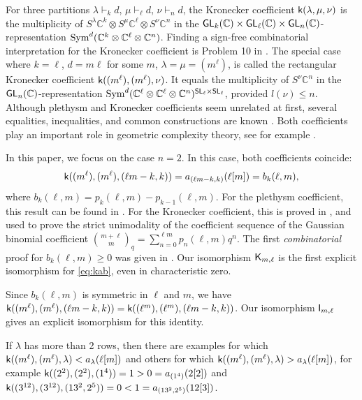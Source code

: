 \documentclass[a4paper]{extarticle}
\newcommand{\IC}{\mathbb{C}}
\newcommand{\GL}{\textsf{\textup{GL}}}
\newcommand{\SL}{\textsf{\textup{SL}}}
\newcommand{\Sym}{\textup{Sym}}
\newcommand{\la}{\lambda}
\newcommand{\KP}{\textsf{\textup{K}}}
\newcommand{\I}{\textsf{\textup{I}}}
\renewcommand{\k}{\textsf{\textup{k}}}
\numberwithin{theorem}{section}
\theoremstyle{definition}
\begin{document}
For three partitions $\la\vdash_k d$, $\mu\vdash_\ell d$, $\nu \vdash_n d$, the Kronecker coefficient $\k(\la,\mu,\nu)$ is the multiplicity of $S^\la \IC^k\otimes S^\mu \IC^\ell\otimes S^\nu \IC^n$ in the $\GL_k(\IC)\times\GL_\ell(\IC)\times\GL_n(\IC)$-representation $\Sym^d(\IC^k\otimes\IC^\ell\otimes\IC^n)$.
Finding a sign-free combinatorial interpretation for the Kronecker coefficient is Problem 10 in \cite{Sta:00}.
The special case where $k=\ell$, $d=m\ell$ for some $m$, $\la=\mu=(m^\ell)$, is called the rectangular Kronecker coefficient $\k((m^\ell),(m^\ell),\nu)$.
It equals the multiplicity of $S^\nu\IC^n$ in the $\GL_n(\IC)$-representation $\Sym^d(\IC^\ell\otimes\IC^\ell\otimes\IC^n)^{\SL_\ell\times\SL_\ell}$,
provided $l(\nu)\leq n$.
Although plethysm and Kronecker coefficients seem unrelated at first, several equalities, inequalities, and common constructions are known \cite{Man:11,Ike:12,IP:17,IMW:17,FI:20}.
Both coefficients play an important role in geometric complexity theory, see for example \cite{BLMW11,Bur16,Bur24}.

In this paper, we focus on the case $n=2$.
In this case, both coefficients coincide:
\begin{equation}\label{eq:kab}
\k((m^\ell),(m^\ell),(\ell m-k,k)) = a_{(\ell m -k,k)}(\ell[m]) = b_k(\ell,m),
\end{equation}
where $b_k(\ell,m) = p_k(\ell,m)-p_{k-1}(\ell,m)$.
For the plethysm coefficient, this result can be found in \cite[Cor.~4.2.8]{Stu:08}.
For the Kronecker coefficient, this is proved in \cite{PP:13,PP:14}, and used to prove the strict unimodality of the coefficient sequence of the Gaussian binomial coefficient $\binom{m+\ell}{m}_q = \sum_{n=0}^{\ell m} p_n(\ell,m) q^n$.
The first \emph{combinatorial} proof for $b_k(\ell,m)\geq 0$ was given in \cite{OHa:90}.
Our isomorphism $\KP_{m,\ell}$ is the first explicit isomorphism for \eqref{eq:kab}, even in characteristic zero.

Since $b_k(\ell,m)$ is symmetric in $\ell$ and $m$, we have
$\k((m^\ell),(m^\ell),(\ell m-k,k)) = \k((\ell^m),(\ell^m),(\ell m-k,k))$.
Our isomorphism $\I_{m,\ell}$ gives an explicit isomorphism for this identity.
 
If $\la$ has more than 2 rows, then there are examples for which $\k((m^\ell),(m^\ell),\la)<a_\la(\ell[m])$
and others for which $\k((m^\ell),(m^\ell),\la)>a_\la(\ell[m])$,
for example
$\k((2^2),(2^2),(1^4))=1>0=a_{(1^4)}(2[2])$
and
$\k((3^{12}),(3^{12}),(13^2,2^5))=0<1=a_{(13^2,2^5)}(12[3])$.
\end{document}
